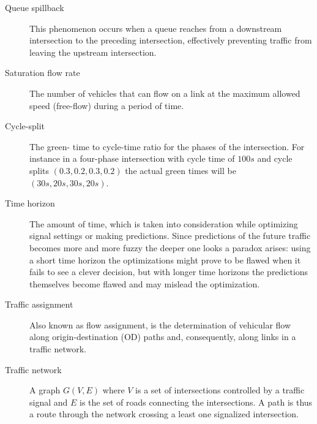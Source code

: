 \begin{description}
\item[Queue spillback] This phenomenon occurs when a queue reaches from a downstream intersection to the preceding intersection, effectively preventing traffic from leaving the upstream intersection.

\item[Saturation flow rate] The number of vehicles that can flow on a link at the maximum allowed speed (free-flow) during a period of time.

	\item[Cycle-split] The green- time to cycle-time ratio for the phases of the intersection. For instance in a four-phase intersection with cycle time of $100s$ and cycle splits $\left( 0.3, 0.2, 0.3, 0.2 \right)$ the actual green times will be $\left( 30s, 20s, 30s, 20s \right)$.	

\item[Time horizon] The amount of time, which is taken into consideration while optimizing signal settings or making predictions. Since predictions of the future traffic becomes more and more fuzzy the deeper one looks a paradox arises: using a short time horizon the optimizations might prove to be flawed when it fails to see a clever decision, but with longer time horizons the predictions themselves become flawed and may mislead the optimization.

	\item[Traffic assignment] Also known as flow assignment, is the determination of vehicular flow along origin-destination (OD) paths and, consequently, along links in a traffic network. 

\item[Traffic network] A graph $G(V,E)$ where $V$ is a set of intersections controlled by a traffic signal and $E$ is the set of roads connecting the intersections. A path is thus a route through the network crossing a least one signalized intersection.


\end{description}
